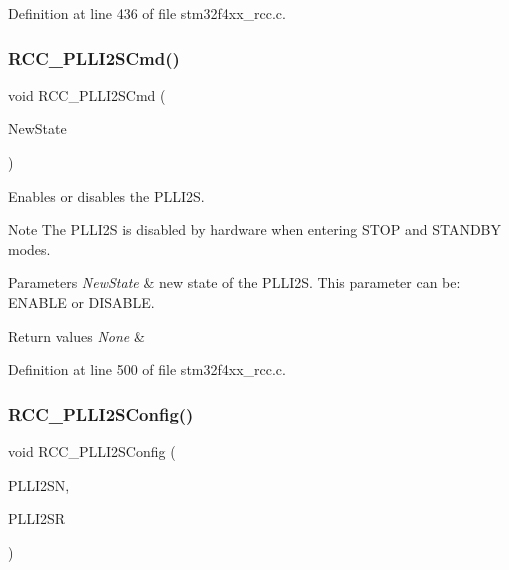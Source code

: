 Definition at line 436 of file stm32f4xx\+\_\+rcc.\+c.

\mbox{\label{group___r_c_c_ga2efe493a6337d5e0034bfcdfb0f541e4}} 
\subsubsection{\texorpdfstring{R\+C\+C\+\_\+\+P\+L\+L\+I2\+S\+Cmd()}{RCC\_PLLI2SCmd()}}
{\footnotesize\ttfamily void R\+C\+C\+\_\+\+P\+L\+L\+I2\+S\+Cmd (\begin{DoxyParamCaption}\item[{Functional\+State}]{New\+State }\end{DoxyParamCaption})}



Enables or disables the P\+L\+L\+I2S. 

\begin{DoxyNote}{Note}
The P\+L\+L\+I2S is disabled by hardware when entering S\+T\+OP and S\+T\+A\+N\+D\+BY modes. 
\end{DoxyNote}

\begin{DoxyParams}{Parameters}
{\em New\+State} & new state of the P\+L\+L\+I2S. This parameter can be\+: E\+N\+A\+B\+LE or D\+I\+S\+A\+B\+LE. \\
\hline
\end{DoxyParams}

\begin{DoxyRetVals}{Return values}
{\em None} & \\
\hline
\end{DoxyRetVals}


Definition at line 500 of file stm32f4xx\+\_\+rcc.\+c.

\mbox{\label{group___r_c_c_ga4c15157382939a693c15620a4867e6ad}} 
\subsubsection{\texorpdfstring{R\+C\+C\+\_\+\+P\+L\+L\+I2\+S\+Config()}{RCC\_PLLI2SConfig()}}
{\footnotesize\ttfamily void R\+C\+C\+\_\+\+P\+L\+L\+I2\+S\+Config (\begin{DoxyParamCaption}\item[{uint32\+\_\+t}]{P\+L\+L\+I2\+SN,  }\item[{uint32\+\_\+t}]{P\+L\+L\+I2\+SR }\end{DoxyParamCaption})}



